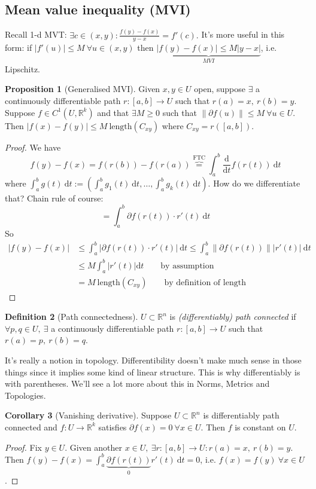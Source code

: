 \documentclass[a4paper]{article}
\theoremstyle{definition}
\newtheorem{defn}{Definition}[subsection]
\newtheorem{prop}[defn]{Proposition}
\newtheorem{coro}[defn]{Corollary}
\begin{document}
\subsection{Mean value inequality (MVI)}
Recall 1-d MVT: $\exists c\in (x,y): \frac{f(y)-f(x)}{y-x}=f'(c).$ It's more useful in this form: if $|f'(u)|\leq M \ \forall u\in (x,y)$ then $\underbrace{|f(y)-f(x)| \leq M|y-x|}_{MVI}$, i.e. Lipschitz.
\begin{prop}[Generalised MVI]
Given $x,y \in U$ open, suppose $\exists$ a continuously differentiable path $r:[a,b] \rightarrow U$ such that $r(a)=x,\ r(b)=y$. Suppose $f\in C^1 (U,\mathbb R^k)$ and that $\exists M\geq 0$ such that $\|\partial f(u)\|\leq M \ \forall u\in U$. Then $|f(x)-f(y)|\leq M \ \text{length} (C_{xy})$ where $C_{xy}=r([a,b])$.
\end{prop}
\begin{proof}
We have
\[
f(y)-f(x) = f(r(b))-f(r(a)) \overbrace{=}^{\text{FTC}} \int_a^b \frac{\mathrm d}{\mathrm d t} f(r(t)) \ \mathrm d t
\]
where $\int_a^b g(t) \ \mathrm d t := \left( \int_a^b g_1(t) \ \mathrm d t,\ldots, \int_a^b g_k(t) \ \mathrm d t \right).$ How do we differentiate that? Chain rule of course:
\[
=\int_a^b \partial f(r(t)) \cdot r'(t) \ \mathrm d t
\]
So
\[
\begin{aligned}
|f(y)-f(x)| &\leq \int_a^b \left| \partial f(r(t)) \cdot r'(t) \right| \ \mathrm d t \leq \int_a^b \|\partial f(r(t)) \| |r'(t)| \ \mathrm d t \\ &\leq M \int_a^b |r'(t)| \mathrm d t \qquad \text{by assumption} \\& = M \ \text{length} (C_{xy}) \qquad \text{by definition of length}
\end{aligned}
\]
\end{proof}
\begin{defn}[Path connectedness]
$U\subset \mathbb R^n$ is \textit{(differentiably) path connected} if $\forall p,q \in U,\ \exists$ a continuously differentiable path $r:[a,b]\rightarrow U$ such that $r(a)=p,\ r(b)=q$.
\end{defn}
It's really a notion in topology. Differentibility doesn't make much sense in those things since it implies some kind of linear structure. This is why differentiably is with parentheses. We'll see a lot more about this in Norms, Metrics and Topologies.

\begin{coro}[Vanishing derivative]
Suppose $U\subset \mathbb R^n$ is differentiably path connected and $f:U\rightarrow \mathbb R^k$ satisfies $\partial f(x)=0 \ \forall x\in U$. Then $f$ is constant on $U$.
\end{coro}
\begin{proof}
Fix $y\in U$. Given another $x\in U, \ \exists r:[a,b]\rightarrow U:r(a)=x,\ r(b)=y$. Then $f(y)-f(x) =\int_a^b \underbrace{\partial f(r(t))}_{0} r'(t) \ \mathrm d t = 0$, i.e. $f(x)=f(y) \ \forall x\in U$.
\end{proof}
\end{document}
